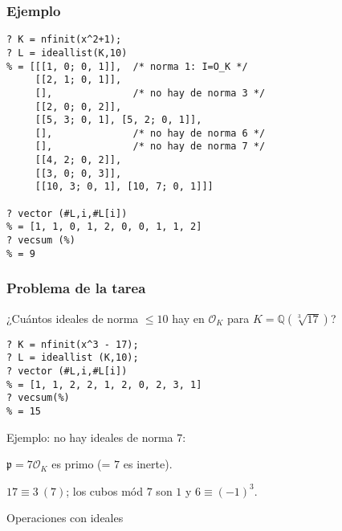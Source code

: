 \documentclass{beamer}
\newcommand{\QQ}{\mathbb{Q}}
\renewcommand{\O}{\mathcal{O}}
\begin{document}

\begin{frame}[fragile]
  \frametitle{Ejemplo}

  \begin{shaded}\small
\begin{verbatim}
? K = nfinit(x^2+1);
? L = ideallist(K,10)
% = [[[1, 0; 0, 1]],  /* norma 1: I=O_K */
     [[2, 1; 0, 1]],
     [],              /* no hay de norma 3 */
     [[2, 0; 0, 2]],
     [[5, 3; 0, 1], [5, 2; 0, 1]],
     [],              /* no hay de norma 6 */
     [],              /* no hay de norma 7 */ 
     [[4, 2; 0, 2]],
     [[3, 0; 0, 3]],
     [[10, 3; 0, 1], [10, 7; 0, 1]]]

? vector (#L,i,#L[i])
% = [1, 1, 0, 1, 2, 0, 0, 1, 1, 2]
? vecsum (%)
% = 9
\end{verbatim}
  \end{shaded}
\end{frame}


\begin{frame}[fragile]
  \frametitle{Problema de la tarea}

  ¿Cuántos ideales de norma $\le 10$ hay en $\O_K$ para
  $K = \QQ (\sqrt[3]{17})$?

  \begin{shaded}\small
\begin{verbatim}
? K = nfinit(x^3 - 17);
? L = ideallist (K,10);
? vector (#L,i,#L[i])
% = [1, 1, 2, 2, 1, 2, 0, 2, 3, 1]
? vecsum(%)
% = 15
\end{verbatim}
  \end{shaded}

  Ejemplo: no hay ideales de norma $7$:

  $\mathfrak{p} = 7\O_K$ es primo (= $7$ es inerte).

  $17 \equiv 3~(7)$; los cubos mód $7$ son $1$ y $6 \equiv (-1)^3$.
\end{frame}


\begin{frame}[plain]
  \headingfont

  \begin{center}
    {\huge Operaciones con ideales}
  \end{center}
\end{frame}
\end{document}
